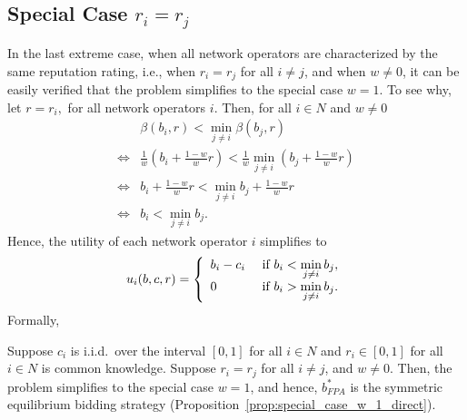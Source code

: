 \subsection{Special Case $r_i=r_j$} %
\label{sub:special_case_r_i_r_j_direct}
In the last extreme case, when all network operators are characterized by the same reputation rating, i.e., when $r_i = r_j$ for all $i\neq j$, and when $w\neq 0$, it can be easily verified that the problem simplifies to the special case $w=1$. To see why, let $r = r_i,$ for all network operators $i$. Then, for all $i\in N$ and $w\neq 0$
\begin{align*}
	&\beta(b_i, r) < \min_{j\neq i} \beta(b_j, r)\\
	\iff &\frac{1}{w} \left(b_i + \frac{1-w}{w} r\right) < \frac{1}{w} \min_{j\neq i} \left(b_j + \frac{1-w}{w} r\right)\\
	\iff &b_i + \frac{1-w}{w} r < \min_{j\neq i} b_j + \frac{1-w}{w} r\\
	\iff &b_i < \min_{j\neq i} b_j.
\end{align*}
Hence, the utility of each network operator $i$ simplifies to
\begin{equation*}
	u_i(b,c,r) = \left\{
	\begin{array}{l l}
		b_i - c_i &\text{ if } b_i < \displaystyle\min_{j\neq i} b_j,\\
		0 &\text{ if } b_i > \displaystyle\min_{j\neq i} b_j.
	\end{array}
	\right.
\end{equation*}
Formally,
\begin{corollary}
\label{cor:special_case_r_i_r_j_direct}
Suppose $c_i$ is i.i.d.~over the interval $[0,1]$ for all $i\in N$ and $r_i\in [0,1]$ for all $i\in N$ is common knowledge. Suppose $r_i = r_j$ for all $i\neq j$, and $w\neq 0$. Then, the problem simplifies to the special case $w=1$, and hence, $b^*_{FPA}$ is the symmetric equilibrium bidding strategy (Proposition~\ref{prop:special_case_w_1_direct}).
\end{corollary}

